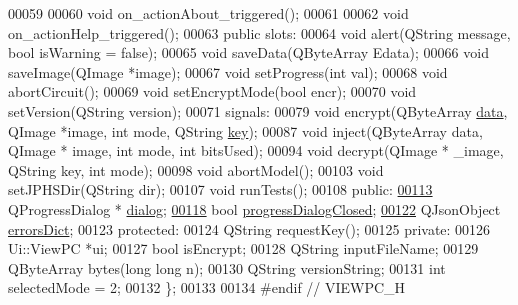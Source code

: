 \begin{DoxyCode}
00059 
00060     \textcolor{keywordtype}{void} on\_actionAbout\_triggered();
00061 
00062     \textcolor{keywordtype}{void} on\_actionHelp\_triggered();
00063 \textcolor{keyword}{public} slots:
00064     \textcolor{keywordtype}{void} alert(QString message, \textcolor{keywordtype}{bool} isWarning = \textcolor{keyword}{false});
00065     \textcolor{keywordtype}{void} saveData(QByteArray Edata);
00066     \textcolor{keywordtype}{void} saveImage(QImage *image);
00067     \textcolor{keywordtype}{void} setProgress(\textcolor{keywordtype}{int} val);
00068     \textcolor{keywordtype}{void} abortCircuit();
00069     \textcolor{keywordtype}{void} setEncryptMode(\textcolor{keywordtype}{bool} encr);
00070     \textcolor{keywordtype}{void} setVersion(QString version);
00071 signals:
00079     \textcolor{keywordtype}{void} encrypt(QByteArray \hyperlink{namespace_errors_dict_setup_af570460846fb9f0c91abd308a095dcdc}{data}, QImage *image, \textcolor{keywordtype}{int} mode, QString \hyperlink{namespace_errors_dict_setup_a09c268098d09ffb8e5504f30fa6d5dd9}{key});
00087     \textcolor{keywordtype}{void} inject(QByteArray data, QImage * image, \textcolor{keywordtype}{int} mode, \textcolor{keywordtype}{int} bitsUsed);
00094     \textcolor{keywordtype}{void} decrypt(QImage * \_image, QString key, \textcolor{keywordtype}{int} mode);
00098     \textcolor{keywordtype}{void} abortModel();
00103     \textcolor{keywordtype}{void} setJPHSDir(QString dir);
00107     \textcolor{keywordtype}{void} runTests();
00108 \textcolor{keyword}{public}:
\hypertarget{viewpc_8h_source.tex_l00113}{}\hyperlink{class_view_p_c_a31abbb470fe329b44e6ffee202b903ca}{00113}     QProgressDialog * \hyperlink{class_view_p_c_a31abbb470fe329b44e6ffee202b903ca}{dialog};
\hypertarget{viewpc_8h_source.tex_l00118}{}\hyperlink{class_view_p_c_add8c82aa2b0b934212aa5bde9277ab36}{00118}     \textcolor{keywordtype}{bool} \hyperlink{class_view_p_c_add8c82aa2b0b934212aa5bde9277ab36}{progressDialogClosed};
\hypertarget{viewpc_8h_source.tex_l00122}{}\hyperlink{class_view_p_c_a26f90436aca32e5bad46f5e69a7e7e09}{00122}     QJsonObject \hyperlink{class_view_p_c_a26f90436aca32e5bad46f5e69a7e7e09}{errorsDict};
00123 \textcolor{keyword}{protected}:
00124     QString requestKey();
00125 \textcolor{keyword}{private}:
00126     Ui::ViewPC *ui;
00127     \textcolor{keywordtype}{bool} isEncrypt;
00128     QString inputFileName;
00129     QByteArray bytes(\textcolor{keywordtype}{long} \textcolor{keywordtype}{long} n);
00130     QString versionString;
00131     \textcolor{keywordtype}{int} selectedMode = 2;
00132 \};
00133 
00134 \textcolor{preprocessor}{#endif // VIEWPC\_H}
\end{DoxyCode}
